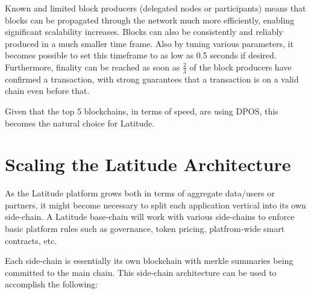 Known and limited block producers (delegated nodes or participants) means that blocks can be propagated through the
network much more efficiently, enabling significant scalability increases. Blocks can also be consistently and reliably
produced in a much smaller time frame. Also by tuning various parameters, it becomes possible to set this timeframe to
as low as 0.5 seconds if desired.  Furthermore, finality can be reached as soon as $\frac{2}{3}$ of the block producers have
confirmed a transaction, with strong guarantees that a transaction is on a valid chain even before that. 

Given that the top 5 blockchains, in terms of speed, are using DPOS, this becomes the natural choice for Latitude.

\newpage
\section{Scaling the Latitude Architecture}
\label{app:latchain}

As the Latitude platform grows both in terms of aggregate data/users or partners, it might become necessary to split
each application vertical into its own side-chain. A Latitude base-chain will work with various side-chains to enforce
basic platform rules such as governance, token pricing, platfrom-wide smart contracts, etc.  

Each side-chain is essentially its own blockchain with merkle summaries being committed to the main chain. This
side-chain architecture can be used to accomplish the following:

